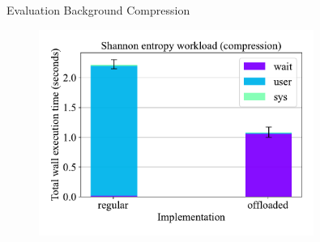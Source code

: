 \documentclass{beamer}
\begin{document}
\begin{frame}{Evaluation Background Compression}
	\begingroup
	\begin{figure}
		\centering
		\includegraphics[width=0.8\textwidth]{resources/images/results.pdf}
	\end{figure}
	\endgroup
\end{frame}

\end{document}

